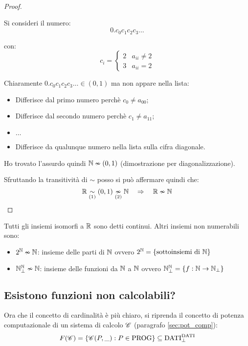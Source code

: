 \begin{proof}
\begin{enumerate}
\begin{minipage}{.48\textwidth}
                Si consideri il numero:
                $$ 0.c_0c_1c_2c_3\dots $$

                con: $$ c_i = \begin{cases}
                2 & a_{ii}\neq2\\
                3 & a_{ii}=2
                \end{cases} $$

            \end{minipage}
            Chiaramente $0.c_0c_1c_2c_3\dots\in(0,1)$ ma non appare nella lista:
            \begin{itemize}
                \item Differisce dal primo numero perchè $c_0\neq a_{00}$;
                \item Differisce dal secondo numero perchè $c_1\neq a_{11}$;
                \item $\dots$
                \item Differisce da qualunque numero nella lista sulla cifra 
                    {\color{red} diagonale}.
            \end{itemize}
            Ho trovato l'assurdo quindi $\mathbb{N} \nsim (0,1)$ (dimostrazione per 
            diagonalizzazione).
    \end{enumerate}
    Sfruttando la transitività di $\sim$ posso si può affermare quindi che:
    $$ \mathbb{R} \underset{(1)}{\sim} (0,1) \underset{(2)}{\nsim} \mathbb{N} \quad \Rightarrow \quad \mathbb{R} \nsim \mathbb{N} $$
\end{proof}

Tutti gli insiemi isomorfi a $\mathbb{R}$ sono detti continui. Altri insiemi non numerabili sono:
\begin{itemize}
    \item $2^{\mathbb{N}}\nsim\mathbb{N}$: insieme delle parti di $\mathbb{N}$ ovvero $2^{\mathbb{N}} = \{\text{sottoinsiemi di } \mathbb{N}\}$
    \item $\mathbb{N}^{\mathbb{N}}_\perp\nsim\mathbb{N}$: insieme delle funzioni da $\mathbb{N}$ a $\mathbb{N}$ ovvero
        $\mathbb{N}^{\mathbb{N}}_\perp = \{f:\mathbb{N}\rightarrow\mathbb{N}_\perp\}$
\end{itemize}

\subsection{Esistono funzioni non calcolabili?}
Ora che il concetto di cardinalità è più chiaro, si riprenda il concetto di 
potenza computazionale di un sistema di calcolo $\mathscr{C}$ (paragrafo \ref{sec:pot_comp}):
$$
F(\mathscr{C}) = \{\mathscr{C}(P,\_):P\in\text{PROG}\} \subseteq \text{DATI}^{\text{DATI}}_\perp
$$

